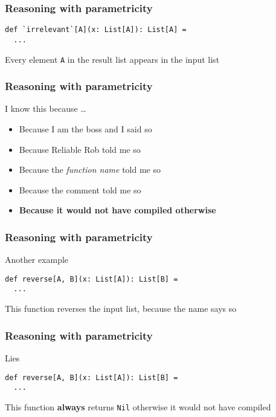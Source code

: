 \begin{frame}[fragile]
\frametitle{Reasoning with parametricity}
\begin{lstlisting}[style=scala]
def `irrelevant`[A](x: List[A]): List[A] = 
  ...
\end{lstlisting}
\begin{theorem}Every element \lstinline{A} in the result list appears in the input list\end{theorem}
\end{frame}

\begin{frame}[fragile]
\frametitle{Reasoning with parametricity}
\begin{block}{I know this because \ldots}
\begin{itemize}
  \item<1> Because I am the boss and I said so
  \item<2> Because Reliable Rob told me so
  \item<3> Because the \emph{function name} told me so
  \item<4> Because the comment told me so
  \item<5> \textbf{Because it would not have compiled otherwise}
\end{itemize}
\end{block}
\end{frame}

\begin{frame}[fragile]
\frametitle{Reasoning with parametricity}
\begin{block}{Another example}
\begin{lstlisting}[style=scala]
def reverse[A, B](x: List[A]): List[B] = 
  ...
\end{lstlisting}
\end{block}
\begin{theorem}This function reverses the input list, because the name says so\end{theorem}
\end{frame}

\begin{frame}[fragile]
\frametitle{Reasoning with parametricity}
\begin{block}{Lies}
\begin{lstlisting}[style=scala]
def reverse[A, B](x: List[A]): List[B] = 
  ...
\end{lstlisting}
\end{block}
\begin{theorem}This function \textbf{always} returns \lstinline{Nil} otherwise it would not have compiled\end{theorem}
\end{frame}

